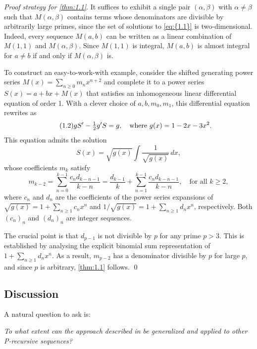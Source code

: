 \documentclass[11pt]{article}
\theoremstyle{definition}
\theoremstyle{plain}
\theoremstyle{remark}
\begin{document}
\noindent \textit{Proof strategy for \cref{thm:1.1}}.  
It suffices to exhibit a single pair $(\alpha,\beta)$ with $\alpha \neq \beta$ such that $M(\alpha,\beta)$ contains terms whose denominators are divisible by arbitrarily large primes, since the set of solutions to \eqref{eq:{1.1}} is two-dimensional. Indeed, every sequence $M(a,b)$ can be written as a linear combination of $M(1,1)$ and $M(\alpha,\beta)$. Since $M(1,1)$ is integral, $M(a,b)$ is almost integral for $a\neq b$ if and only if $M(\alpha,\beta)$ is.

To construct an easy-to-work-with example, consider the shifted generating power series $M(x) = \sum_{n \geq 0} m_n x^{n+2}$ and complete it to a power series $S(x) = a + b x + M(x)$ that satisfies an inhomogeneous linear differential equation of order 1. With a clever choice of $a, b, m_0, m_1$, this differential equation rewrites as
\begin{equation}\label{eq:{1.2}}\tag{1.2}
gS' - \tfrac{1}{2}g'S = g, \quad \text{where } g(x) = 1 - 2x - 3x^2.
\end{equation}
This equation admits the solution
\[
S(x) = \sqrt{g(x)} \int \frac{1}{\sqrt{g(x)}}\,dx,
\]
whose coefficients $m_k$ satisfy
\[
m_{k-2} = \sum_{n=0}^{k-1} \frac{c_n d_{k-n-1}}{k-n} = \frac{d_{k-1}}{k} + \sum_{n=1}^{k-1} \frac{c_n d_{k-n-1}}{k-n}, \quad \text{for all } k \geq 2,
\]
where $c_n$ and $d_n$ are the coefficients of the power series expansions of $\sqrt{g(x)} = 1+\sum\limits_{n\geq 1}c_nx^n$ and $1/\sqrt{g(x)} = 1+\sum\limits_{n\geq1} d_nx^n$, respectively. Both $(c_n)_n$ and $(d_n)_n$ are integer sequences.

The crucial point is that $d_{p-1}$ is not divisible by $p$ for any prime $p > 3$. This is established by analysing the explicit binomial sum representation of $1+\sum\limits_{n\geq 1} d_nx^n$. As a result, $m_{p-2}$ has a denominator divisible by $p$ for large $p$, and since $p$ is arbitrary, \cref{thm:1.1} follows. \qed

\subsection{Discussion}

A natural question to ask is:

\textit{To what extent can the approach described in \cite{KL05} be generalized and applied to other P-recursive sequences?}
\end{document}
